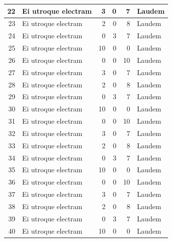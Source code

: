\begin{small}
\begin{longtable}[c]{|r|l|r|r|r|l|}
22   & Ei utroque electram & 3  & 0  & 7  & Laudem  \\ \hline
23   & Ei utroque electram & 2  & 0  & 8  & Laudem  \\ \hline
24   & Ei utroque electram & 0  & 3  & 7  & Laudem  \\ \hline
25   & Ei utroque electram & 10 & 0  & 0  & Laudem  \\ \hline
26   & Ei utroque electram & 0  & 0  & 10 & Laudem  \\ \hline
27   & Ei utroque electram & 3  & 0  & 7  & Laudem  \\ \hline
28   & Ei utroque electram & 2  & 0  & 8  & Laudem  \\ \hline
29   & Ei utroque electram & 0  & 3  & 7  & Laudem  \\ \hline
30   & Ei utroque electram & 10 & 0  & 0  & Laudem  \\ \hline
31   & Ei utroque electram & 0  & 0  & 10 & Laudem  \\ \hline
32   & Ei utroque electram & 3  & 0  & 7  & Laudem  \\ \hline
33   & Ei utroque electram & 2  & 0  & 8  & Laudem  \\ \hline
34   & Ei utroque electram & 0  & 3  & 7  & Laudem  \\ \hline
35   & Ei utroque electram & 10 & 0  & 0  & Laudem  \\ \hline
36   & Ei utroque electram & 0  & 0  & 10 & Laudem  \\ \hline
37   & Ei utroque electram & 3  & 0  & 7  & Laudem  \\ \hline
38   & Ei utroque electram & 2  & 0  & 8  & Laudem  \\ \hline
39   & Ei utroque electram & 0  & 3  & 7  & Laudem  \\ \hline
40   & Ei utroque electram & 10 & 0  & 0  & Laudem  \\ \hline

\end{longtable}
\end{small}

